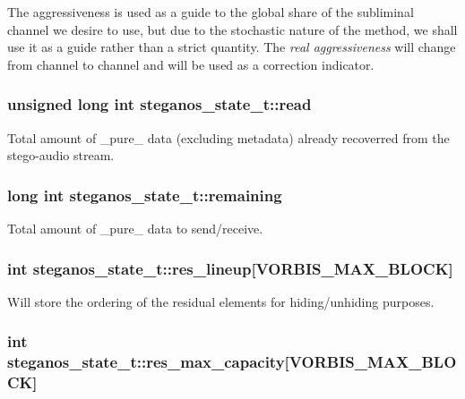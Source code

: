 \label{structsteganos__state__t_a35b6704fbd31ab23984a713fdcef43a8}
The aggressiveness is used as a guide to the global share of the subliminal channel we desire to use, but due to the stochastic nature of the method, we shall use it as a guide rather than a strict quantity. The {\itshape real aggressiveness\/} will change from channel to channel and will be used as a correction indicator. \hypertarget{structsteganos__state__t_a0a1685f67dade1dc4c5f23458d9abdd9}{
\subsubsection[{read}]{\setlength{\rightskip}{0pt plus 5cm}unsigned long int {\bf steganos\_\-state\_\-t::read}}}
\label{structsteganos__state__t_a0a1685f67dade1dc4c5f23458d9abdd9}
Total amount of \_\-pure\_\- data (excluding metadata) already recoverred from the stego-\/audio stream. \hypertarget{structsteganos__state__t_a17f9b729e28f08375fd0ae7679f98436}{
\subsubsection[{remaining}]{\setlength{\rightskip}{0pt plus 5cm}long int {\bf steganos\_\-state\_\-t::remaining}}}
\label{structsteganos__state__t_a17f9b729e28f08375fd0ae7679f98436}
Total amount of \_\-pure\_\- data to send/receive. \hypertarget{structsteganos__state__t_ae9b6a306ba7eda4266782af5429b097c}{
\subsubsection[{res\_\-lineup}]{\setlength{\rightskip}{0pt plus 5cm}int {\bf steganos\_\-state\_\-t::res\_\-lineup}\mbox{[}VORBIS\_\-MAX\_\-BLOCK\mbox{]}}}
\label{structsteganos__state__t_ae9b6a306ba7eda4266782af5429b097c}
Will store the ordering of the residual elements for hiding/unhiding purposes. \hypertarget{structsteganos__state__t_afc33131ff2db5dc8a1f31a6ba5f1c724}{
\subsubsection[{res\_\-max\_\-capacity}]{\setlength{\rightskip}{0pt plus 5cm}int {\bf steganos\_\-state\_\-t::res\_\-max\_\-capacity}\mbox{[}VORBIS\_\-MAX\_\-BLOCK\mbox{]}}}
